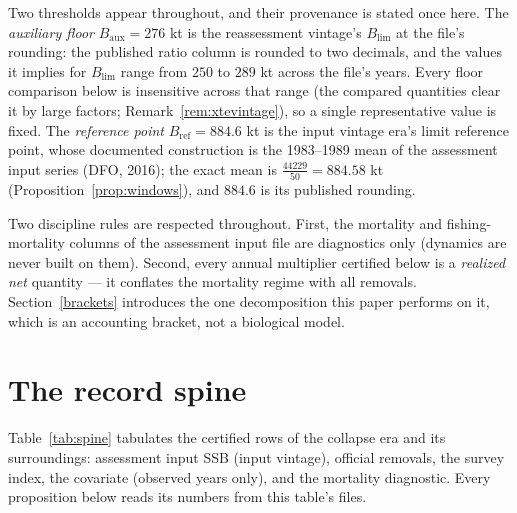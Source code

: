 \documentclass[10pt,twocolumn]{article}
\theoremstyle{plain}
\theoremstyle{remark}
\begin{document}
Two thresholds appear throughout, and their provenance is stated once
here. The \emph{auxiliary floor} \(B_{\mathrm{aux}} = 276\) kt is the
reassessment vintage's \(B_{\mathrm{lim}}\) at the file's rounding: the
published ratio column is rounded to two decimals, and the values it
implies for \(B_{\mathrm{lim}}\) range from \(250\) to \(289\) kt
across the file's years. Every floor comparison below is insensitive
across that range (the compared quantities clear it by large factors;
Remark~\ref{rem:xtevintage}), so a single representative value is
fixed. The \emph{reference point} \(B_{\mathrm{ref}} = 884.6\) kt is
the input vintage era's limit reference point, whose documented
construction is the 1983--1989 mean of the assessment input series
(DFO, 2016); the exact mean is
\(\tfrac{44229}{50} = 884.58\) kt (Proposition~\ref{prop:windows}),
and \(884.6\) is its published rounding.

Two discipline rules are respected throughout. First, the mortality
and fishing-mortality columns of the assessment input file are
diagnostics only (dynamics are never built on them). Second, every
annual multiplier certified below is a \emph{realized net} quantity ---
it conflates the mortality regime with all removals. Section~\ref{brackets}
introduces the one decomposition this paper performs on it, which is
an accounting bracket, not a biological model.

\section{The record spine}\label{spine}

Table~\ref{tab:spine} tabulates the certified rows of the collapse era
and its surroundings: assessment input SSB (input vintage), official
removals, the survey index, the covariate (observed years only), and
the mortality diagnostic. Every proposition below reads its numbers
from this table's files.
\end{document}
